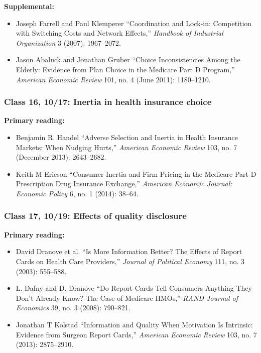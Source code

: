 \documentclass[11pt,]{article}
\providecommand{\tightlist}{%
  \setlength{\itemsep}{0pt}\setlength{\parskip}{0pt}}
\begin{document}
\textbf{Supplemental:}

\begin{itemize}
\tightlist
\item
  Joseph Farrell and Paul Klemperer {``Coordination and Lock-in:
  {Competition} with Switching Costs and Network Effects,''}
  \emph{Handbook of Industrial Organization} 3 (2007): 1967--2072.
\item
  Jason Abaluck and Jonathan Gruber {``Choice {Inconsistencies} Among
  the {Elderly}: {Evidence} from {Plan} {Choice} in the {Medicare}
  {Part} {D} {Program},''} \emph{American Economic Review} 101, no. 4
  (June 2011): 1180--1210.
\end{itemize}

\hypertarget{class-16-1017-inertia-in-health-insurance-choice}{%
\subsubsection{Class 16, 10/17: Inertia in health insurance
choice}\label{class-16-1017-inertia-in-health-insurance-choice}}

\textbf{Primary reading:}

\begin{itemize}
\tightlist
\item
  Benjamin R. Handel {``Adverse {Selection} and {Inertia} in {Health}
  {Insurance} {Markets}: {When} {Nudging} {Hurts},''} \emph{American
  Economic Review} 103, no. 7 (December 2013): 2643--2682.
\item
  Keith M Ericson {``Consumer Inertia and Firm Pricing in the {Medicare}
  {Part} {D} Prescription Drug Insurance Exchange,''} \emph{American
  Economic Journal: Economic Policy} 6, no. 1 (2014): 38--64.
\end{itemize}

\hypertarget{class-17-1019-effects-of-quality-disclosure}{%
\subsubsection{Class 17, 10/19: Effects of quality
disclosure}\label{class-17-1019-effects-of-quality-disclosure}}

\textbf{Primary reading:}

\begin{itemize}
\tightlist
\item
  David Dranove et al. {``Is {More} {Information} {Better}? {The}
  {Effects} of {Report} {Cards} on {Health} {Care} {Providers},''}
  \emph{Journal of Political Economy} 111, no. 3 (2003): 555--588.
\item
  L. Dafny and D. Dranove {``Do Report Cards Tell Consumers Anything
  They Don't Already Know? {The} Case of {Medicare} {HMOs},''}
  \emph{RAND Journal of Economics} 39, no. 3 (2008): 790--821.
\item
  Jonathan T Kolstad {``Information and Quality When Motivation Is
  Intrinsic: {Evidence} from Surgeon Report Cards,''} \emph{American
  Economic Review} 103, no. 7 (2013): 2875--2910.
\end{itemize}
\end{document}
